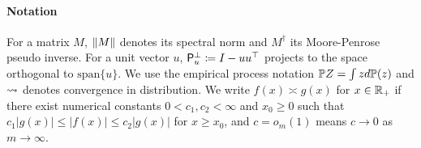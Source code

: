 
\paragraph{Notation}
For a matrix $M$, $\left\|{M}\right\|$ denotes its spectral norm and $M^\dagger$ its
Moore-Penrose pseudo inverse.
%
For a unit vector $u$, $\mathsf{P}_{u}^\perp \coloneqq
I - u u^\top$ projects to the space orthogonal to $\mathrm{span}\{u\}$.
%
We use the empirical process notation $\mathbb{P} Z = \int z d\mathbb{P}(z)$ and $\rightsquigarrow$
denotes convergence in distribution.
%
We write $f(x) \asymp g(x)$ for $x \in \mathbb{R}_+$ if there exist
numerical constants $0 < c_1, c_2 < \infty$ and $x_0 \geq 0$ such that $c_1
|g(x)| \leq |f(x)| \leq c_2|g(x)|$ for $x \geq x_0$,
and
$c = o_m(1)$ means $c \to 0$ as $m \to \infty$.

